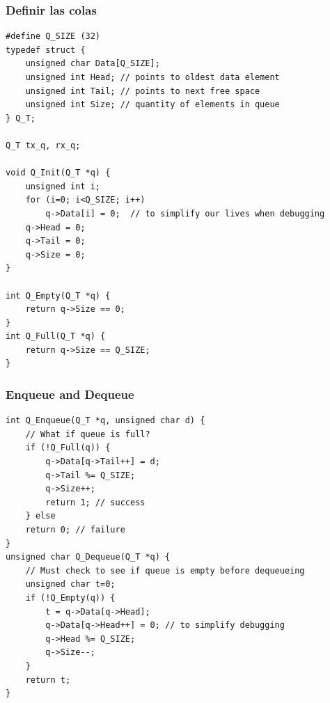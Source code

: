 \documentclass[10.5pt,scale=1.0,t,aspectratio=169,hyperref={pdfpagelabels=false}]{beamer}
\begin{document}
\begin{frame}[fragile]
	\frametitle{Definir las colas}
	{\footnotesize
	\begin{lstlisting}[style=CStyle]
#define Q_SIZE (32)
typedef struct {
	unsigned char Data[Q_SIZE];
	unsigned int Head; // points to oldest data element
	unsigned int Tail; // points to next free space 
	unsigned int Size; // quantity of elements in queue
} Q_T;

Q_T tx_q, rx_q;

void Q_Init(Q_T *q) {
	unsigned int i;
	for (i=0; i<Q_SIZE; i++)  
		q->Data[i] = 0;  // to simplify our lives when debugging
	q->Head = 0;
	q->Tail = 0;
	q->Size = 0;
}

int Q_Empty(Q_T *q) {
	return q->Size == 0;
}
int Q_Full(Q_T *q) {
	return q->Size == Q_SIZE;
}
	\end{lstlisting}		
	}
\end{frame}
\begin{frame}[fragile]
	\frametitle{Enqueue and Dequeue}
	{\footnotesize
		\begin{lstlisting}[style=CStyle]
int Q_Enqueue(Q_T *q, unsigned char d) {
	// What if queue is full?
	if (!Q_Full(q)) {
		q->Data[q->Tail++] = d;
		q->Tail %= Q_SIZE;
		q->Size++;
		return 1; // success
	} else 
	return 0; // failure
}
unsigned char Q_Dequeue(Q_T *q) {
	// Must check to see if queue is empty before dequeueing
	unsigned char t=0;
	if (!Q_Empty(q)) {
		t = q->Data[q->Head];
		q->Data[q->Head++] = 0; // to simplify debugging
		q->Head %= Q_SIZE;
		q->Size--;
	}
	return t;
}

		\end{lstlisting}		
	}
\end{frame}
\end{document}
